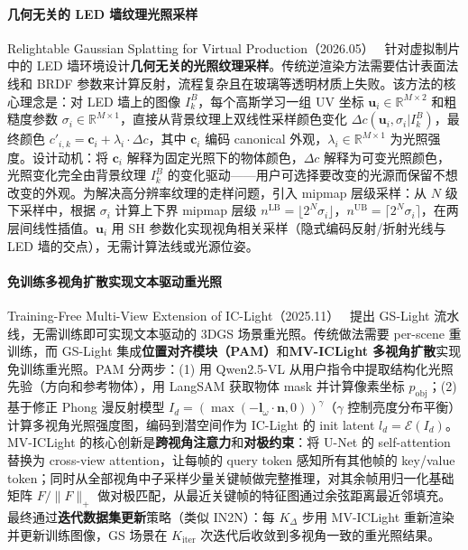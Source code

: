 \paragraph{几何无关的 LED 墙纹理光照采样}

Relightable Gaussian Splatting for Virtual Production（2026.05）~\cite{2605_09024} 针对虚拟制片中的 LED 墙环境设计\textbf{几何无关的光照纹理采样}。传统逆渲染方法需要估计表面法线和 BRDF 参数来计算反射，流程复杂且在玻璃等透明材质上失败。该方法的核心理念是：对 LED 墙上的图像 $I_k^B$，每个高斯学习一组 UV 坐标 $\mathbf{u}_i \in \mathbb{R}^{M \times 2}$ 和粗糙度参数 $\sigma_i \in \mathbb{R}^{M \times 1}$，直接从背景纹理上双线性采样颜色变化 $\Delta c(\mathbf{u}_i, \sigma_i | I_k^B)$，最终颜色 $c'_{i,k} = \mathbf{c}_i + \lambda_i \cdot \Delta c$，其中 $\mathbf{c}_i$ 编码 canonical 外观，$\lambda_i \in \mathbb{R}^{M \times 1}$ 为光照强度。设计动机：将 $\mathbf{c}_i$ 解释为固定光照下的物体颜色，$\Delta c$ 解释为可变光照颜色，光照变化完全由背景纹理 $I_k^B$ 的变化驱动——用户可选择要改变的光源而保留不想改变的外观。为解决高分辨率纹理的走样问题，引入 mipmap 层级采样：从 $N$ 级下采样中，根据 $\sigma_i$ 计算上下界 mipmap 层级 $n^{\text{LB}} = \lfloor 2^N \sigma_i \rfloor$，$n^{\text{UB}} = \lceil 2^N \sigma_i \rceil$，在两层间线性插值。$\mathbf{u}_i$ 用 SH 参数化实现视角相关采样（隐式编码反射/折射光线与 LED 墙的交点），无需计算法线或光源位姿。

\paragraph{免训练多视角扩散实现文本驱动重光照}

Training-Free Multi-View Extension of IC-Light（2025.11）~\cite{2511_13684} 提出 GS-Light 流水线，无需训练即可实现文本驱动的 3DGS 场景重光照。传统做法需要 per-scene 重训练，而 GS-Light 集成\textbf{位置对齐模块（PAM）}和\textbf{MV-ICLight 多视角扩散}实现免训练重光照。PAM 分两步：(1) 用 Qwen2.5-VL 从用户指令中提取结构化光照先验（方向和参考物体），用 LangSAM 获取物体 mask 并计算像素坐标 $p_{\text{obj}}$；(2) 基于修正 Phong 漫反射模型 $I_d = (\max(-\mathbf{l}_\omega \cdot \mathbf{n}, 0))^\gamma$（$\gamma$ 控制亮度分布平衡）计算多视角光照强度图，编码到潜空间作为 IC-Light 的 init latent $l_d = \mathcal{E}(I_d)$。MV-ICLight 的核心创新是\textbf{跨视角注意力}和\textbf{对极约束}：将 U-Net 的 self-attention 替换为 cross-view attention，让每帧的 query token 感知所有其他帧的 key/value token；同时从全部视角中子采样少量关键帧做完整推理，对其余帧用归一化基础矩阵 $F/\|F\|_+$ 做对极匹配，从最近关键帧的特征图通过余弦距离最近邻填充。最终通过\textbf{迭代数据集更新}策略（类似 IN2N）：每 $K_\Delta$ 步用 MV-ICLight 重新渲染并更新训练图像，GS 场景在 $K_{\text{iter}}$ 次迭代后收敛到多视角一致的重光照结果。

